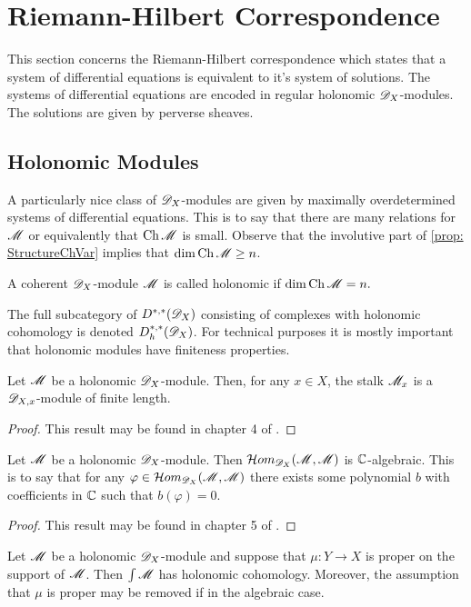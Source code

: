 \section{Riemann-Hilbert Correspondence}\label{sec: Riemann-Hilbert}
This section concerns the Riemann-Hilbert correspondence which states that a system of differential equations is equivalent to it's system of solutions.
The systems of differential equations are encoded in regular holonomic $\mathscr{D}_X$-modules.
The solutions are given by perverse sheaves.
\subsection{Holonomic Modules}
A particularly nice class of $\mathscr{D}_X$-modules are given by maximally overdetermined systems of differential equations.
This is to say that there are many relations for $\mathscr{M}$ or equivalently that $\operatorname{Ch}\mathscr{M}$ is small.
Observe that the involutive part of \cref{prop: StructureChVar} implies that $\dim \operatorname{Ch}\mathscr{M} \geq n$.
\begin{definition}
  A coherent $\mathscr{D}_X$-module $\mathscr{M}$ is called holonomic if
  $\dim \operatorname{Ch} \mathscr{M}  = n.$
\end{definition}
The full subcategory of $D^{*,*}(\mathscr{D}_X)$ consisting of complexes with holonomic cohomology is denoted $D_h^{*,*}(\mathscr{D}_X)$.
For technical purposes it is mostly important that holonomic modules have finiteness properties.
\begin{proposition}\label{prop: FiniteLength}
  Let $\mathscr{M}$ be a holonomic $\mathscr{D}_X$-module. Then, for any $x\in X$, the stalk $\mathscr{M}_x$ is a $\mathscr{D}_{X,x}$-module of finite length.
\end{proposition}
\begin{proof}
  This result may be found in chapter 4 of \cite{kashiwara2003d}.
\end{proof}
\begin{proposition}\label{prop: HomAlgebraic}
  Let $\mathscr{M}$ be a holonomic $\mathscr{D}_X$-module. Then $\mathcal{H}om_{\mathscr{D}_X}(\mathscr{M},\mathscr{M})$ is $\mathbb{C}$-algebraic. This is to say that for any $\varphi \in\mathcal{H}om_{\mathscr{D}_X}(\mathscr{M},\mathscr{M}) $ there exists some polynomial $b$ with coefficients in $\mathbb{C}$ such that $b(\varphi)=0$.
\end{proposition}
\begin{proof}
  This result may be found in chapter 5 of \cite{bjork1979rings}.
\end{proof}
\begin{proposition}
  Let $\mathscr{M}$ be a holonomic $\mathscr{D}_X$-module and suppose that $\mu:Y\to X$ is proper on the support of $\mathscr{M}$. Then $\int \mathscr{M}$ has holonomic cohomology. Moreover, the assumption that $\mu$ is proper may be removed if in the algebraic case.
\end{proposition}
